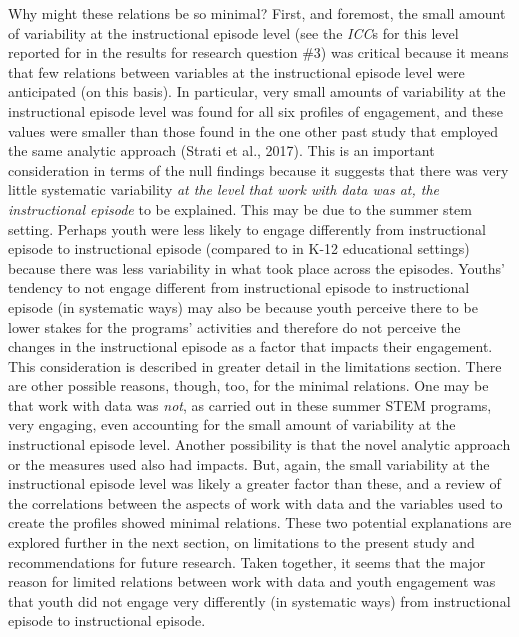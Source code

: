 \documentclass[]{msu-thesis}
\theoremstyle{definition}
\theoremstyle{definition}
\theoremstyle{definition}
\theoremstyle{remark}
\begin{document}
Why might these relations be so minimal? First, and foremost, the small
amount of variability at the instructional episode level (see the
\emph{ICC}s for this level reported for in the results for research
question \#3) was critical because it means that few relations between
variables at the instructional episode level were anticipated (on this
basis). In particular, very small amounts of variability at the
instructional episode level was found for all six profiles of
engagement, and these values were smaller than those found in the one
other past study that employed the same analytic approach (Strati et
al., 2017). This is an important consideration in terms of the null
findings because it suggests that there was very little systematic
variability \emph{at the level that work with data was at, the
instructional episode} to be explained. This may be due to the summer
stem setting. Perhaps youth were less likely to engage differently from
instructional episode to instructional episode (compared to in K-12
educational settings) because there was less variability in what took
place across the episodes. Youths' tendency to not engage different from
instructional episode to instructional episode (in systematic ways) may
also be because youth perceive there to be lower stakes for the
programs' activities and therefore do not perceive the changes in the
instructional episode as a factor that impacts their engagement. This
consideration is described in greater detail in the limitations section.
There are other possible reasons, though, too, for the minimal
relations. One may be that work with data was \emph{not}, as carried out
in these summer STEM programs, very engaging, even accounting for the
small amount of variability at the instructional episode level. Another
possibility is that the novel analytic approach or the measures used
also had impacts. But, again, the small variability at the instructional
episode level was likely a greater factor than these, and a review of
the correlations between the aspects of work with data and the variables
used to create the profiles showed minimal relations. These two
potential explanations are explored further in the next section, on
limitations to the present study and recommendations for future
research. Taken together, it seems that the major reason for limited
relations between work with data and youth engagement was that youth did
not engage very differently (in systematic ways) from instructional
episode to instructional episode.
\end{document}

